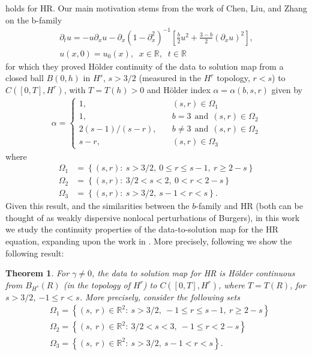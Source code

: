 \documentclass[12pt,reqno]{amsart}
\numberwithin{equation}{section}  %
\numberwithin{figure}{section}
\newcommand{\rr}{\mathbb{R}}
\newcommand{\p}{\partial}
\newtheorem{theorem}{Theorem}[section]
\begin{document}
holds for HR\@. Our main motivation stems from the work of Chen, Liu, and Zhang
\cite{Chen:2011fk} on the
b-family
%
%
\begin{gather}
\p_t u =  -u \p_x u -
\p_{x} (1 - \p_{x}^{2})^{-1} \left[ \frac{b}{2}u^2 +
\frac{3-b}{2} \left( \p_x u \right)^2
\right],
\label{b-family}
\\
u(x,0) = u_0(x), \; \; x \in \rr, \; \; t \in \rr
\label{init-cond-b-fam}
\end{gather}
%
%
for which they proved H\"older continuity of the data to solution map from a closed ball $B(0, h)$ in $H^{s}$, $s >
3/2$ (measured in the $H^{r}$ topology, $r <s$) to $C([0, T], H^{r})$, with $T
= T(h)> 0$ and H\"older index $\alpha = \alpha(b, s, r)$ given by 
%
%
\begin{equation*}
\begin{split}
\alpha = 
\begin{cases}
1, \quad & (s, r) \in \Omega_{1}
\\
1, \quad & b=3 \ \ \text{and} \ \ (s, r) \in \Omega_{2}
\\
2(s-1)/(s-r), \quad  & b\neq 3 \ \ \text{and} \ \ (s, r) \in \Omega_{2}
\\
s-r, \quad & (s, r) \in \Omega_{3}
\end{cases}
\end{split}
\end{equation*}
%
%
where
\begin{equation*}
\begin{split}
\Omega_{1} & = \left\{ (s, r): \   s > 3/2, \ 0 \le r \le s-1, \  r \ge 2-s \right\}
\\
\Omega_{2} & = \left\{(s, r): \  3/2 < s < 2, \ 0 < r < 2-s   \right\}
\\
\Omega_{3} & = \left\{ (s,r): \  s > 3/2, \ s-1 < r < s  \right\}.
\end{split}
\end{equation*}
Given this result, and the similarities between the $b$-family and HR (both can
be thought of as weakly dispersive nonlocal perturbations of Burgers), in this
work we study the continuity properties of the
data-to-solution map for the HR equation, expanding upon the work in
\cite{Karapetyan:2010fk}. More precisely, following \cite{Chen:2011fk} we show
the following result:
%
%
\begin{theorem}
For $\gamma \neq 0$, the
data to solution map for HR is H\"older continuous from $B_{H^{s}}(R)$ (in
the topology of $H^{r}$) to $C([0, T], H^{r})$, where $T = T(R)$, for $s >
3/2$, $-1 \le r < s$. More
precisely, consider the following sets 
%
%
\begin{equation*}
\begin{split}
& \Omega_{1} = \left\{ (s, \ r) \in \rr^{2}:
\ s>3/2, \ -1 \le r \le s-1, \  r \ge 2 -s  \right\}
\\
& \Omega_{2} = \left\{ (s, \ r) \in \rr^{2}:
\ 3/2 < s < 3, \ -1 \le r < 2-s \right\}
\\
& \Omega_{3} = \left\{ (s, \ r) \in \rr^{2}:
\  s>3/2, \  s-1 < r < s  \right\}.
\end{split}
\end{equation*}
%
%
\label{thm:main-thm}
\end{theorem}
\end{document}
